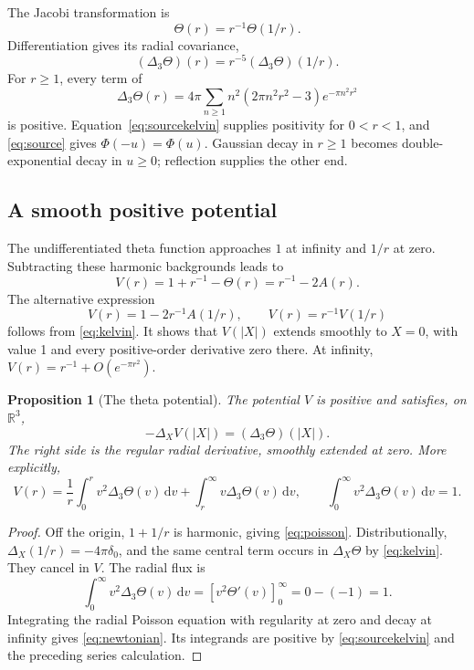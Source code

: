\documentclass[11pt]{article}
\newtheorem{proposition}{Proposition}[section]
\theoremstyle{remark}
\numberwithin{equation}{section}
\newcommand{\R}{\mathbb R}
\newcommand{\dd}{\,\mathrm d}
\begin{document}
The Jacobi transformation \cite[Eq.~20.7.32]{DLMF} is
\begin{equation}\label{eq:kelvin}
 \Theta(r)=r^{-1}\Theta(1/r).
\end{equation}
Differentiation gives its radial covariance,
\begin{equation}\label{eq:sourcekelvin}
 (\Delta_3\Theta)(r)=r^{-5}(\Delta_3\Theta)(1/r).
\end{equation}
For \(r\ge1\), every term of
\[
 \Delta_3\Theta(r)=4\pi\sum_{n\ge1}
 n^2(2\pi n^2r^2-3)e^{-\pi n^2r^2}
\]
is positive. Equation~\eqref{eq:sourcekelvin} supplies positivity for
\(0<r<1\), and \eqref{eq:source} gives \(\Phi(-u)=\Phi(u)\).
Gaussian decay in \(r\ge1\) becomes double-exponential decay in
\(u\ge0\); reflection supplies the other end.

\subsection{A smooth positive potential}

The undifferentiated theta function approaches \(1\) at infinity and
\(1/r\) at zero. Subtracting these harmonic backgrounds leads to
\begin{equation}\label{eq:V}
 \boxed{V(r)=1+r^{-1}-\Theta(r)=r^{-1}-2A(r).}
\end{equation}
The alternative expression
\begin{equation}\label{eq:Vendpoints}
 V(r)=1-2r^{-1}A(1/r),\qquad V(r)=r^{-1}V(1/r)
\end{equation}
follows from \eqref{eq:kelvin}. It shows that \(V(|X|)\) extends
smoothly to \(X=0\), with value 1 and every positive-order derivative
zero there. At infinity, \(V(r)=r^{-1}+O(e^{-\pi r^2})\).

\begin{proposition}[The theta potential]\label{prop:potential}
The potential \(V\) is positive and satisfies, on \(\R^3\),
\begin{equation}\label{eq:poisson}
 -\Delta_XV(|X|)=(\Delta_3\Theta)(|X|).
\end{equation}
The right side is the regular radial derivative, smoothly extended at
zero. More explicitly,
\begin{equation}\label{eq:newtonian}
 V(r)=\frac1r\int_0^r v^2\Delta_3\Theta(v)\dd v
       +\int_r^\infty v\Delta_3\Theta(v)\dd v,
 \qquad \int_0^\infty v^2\Delta_3\Theta(v)\dd v=1.
\end{equation}
\end{proposition}
\begin{proof}
Off the origin, \(1+1/r\) is harmonic, giving \eqref{eq:poisson}.
Distributionally, \(\Delta_X(1/r)=-4\pi\delta_0\), and the same
central term occurs in \(\Delta_X\Theta\) by \eqref{eq:kelvin}.
They cancel in \(V\). The radial flux is
\[
 \int_0^\infty v^2\Delta_3\Theta(v)\dd v
 =[v^2\Theta'(v)]_0^\infty=0-(-1)=1.
\]
Integrating the radial Poisson equation with regularity at zero and
decay at infinity gives \eqref{eq:newtonian}. Its integrands are
positive by \eqref{eq:sourcekelvin} and the preceding series calculation.
\end{proof}
\end{document}
